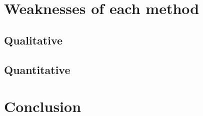 \documentclass[conference]{IEEEtran}
\begin{document}
\section{Weaknesses of each method}

\subsection{Qualitative}

\subsection{Quantitative}

\section{Conclusion}



\end{document}

